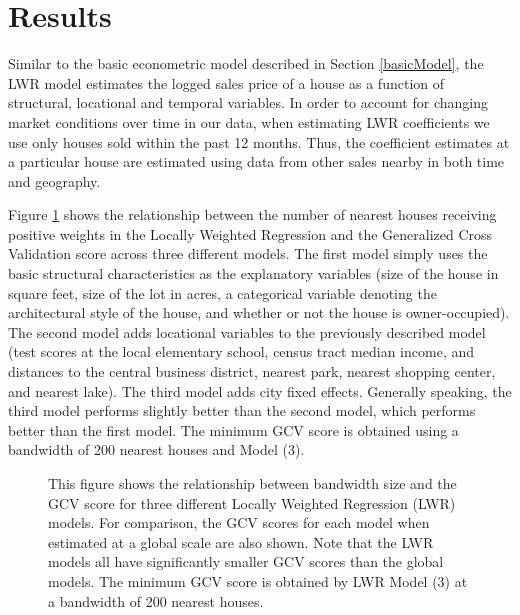 \documentclass{article}\usepackage{graphicx, color}
\begin{document}
\section{Results}
Similar to the basic econometric model described in Section \ref{basicModel}, the LWR model estimates the logged sales price of a house as a function of structural, locational and temporal variables. In order to account for changing market conditions over time in our data, when estimating LWR coefficients we use only houses sold within the past 12 months. Thus, the coefficient estimates at a particular house are estimated using data from other sales nearby in both time and geography.

Figure \ref{fig:GCVmodel} shows the relationship between the number of nearest houses receiving positive weights in the Locally Weighted Regression and the Generalized Cross Validation score across three different models. The first model simply uses the basic structural characteristics as the explanatory variables (size of the house in square feet, size of the lot in acres, a categorical variable denoting the architectural style of the house, and whether or not the house is owner-occupied). The second model adds locational variables to the previously described model (test scores at the local elementary school, census tract median income, and distances to the central business district, nearest park, nearest shopping center, and nearest lake). The third model adds city fixed effects. Generally speaking, the third model performs slightly better than the second model, which performs better than the first model. The minimum GCV score is obtained using a bandwidth of 200 nearest houses and Model (3).
\begin{figure}
\caption{This figure shows the relationship between bandwidth size and the GCV score for three different Locally Weighted Regression (LWR) models. For comparison, the GCV scores for each model when estimated at a global scale are also shown. Note that the LWR models all have significantly smaller GCV scores than the global models. The minimum GCV score is obtained by LWR Model (3) at a bandwidth of 200 nearest houses.}\label{fig:GCVmodel}
\end{figure}
\end{document}

